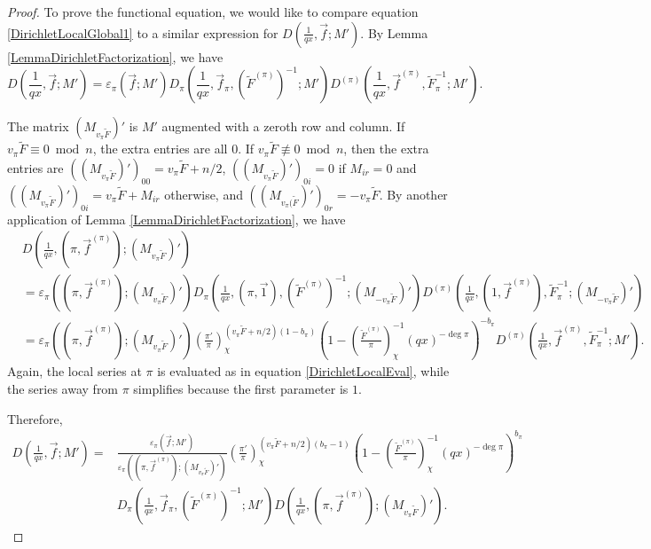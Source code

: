 \documentclass[11pt,letterpaper]{article}
\theoremstyle{definition}
\theoremstyle{remark}
\numberwithin{equation}{section}
\theoremstyle{dotless}
\newcommand{\res}[2]{\left(\frac{#1}{#2}\right)}
\renewcommand{\tilde}{\widetilde}
\begin{document}
\begin{proof}
To prove the functional equation, we would like to compare equation \eqref{DirichletLocalGlobal1} to a similar expression for $D\left(\frac{1}{qx}, \vec{f}; M'\right)$. By Lemma \ref{LemmaDirichletFactorization}, we have  
\begin{equation*}
    D\left(\frac{1}{qx}, \vec{f}; M'\right) = \varepsilon_\pi(\vec{f}; M') D_{\pi}\left(\frac{1}{qx}, \vec{f}_{\pi}, (\tilde{F}^{(\pi)})^{-1}; M'\right) D^{(\pi)}\left(\frac{1}{qx}, \vec{f}^{(\pi)}, \tilde{F}_{\pi}^{-1}; M'\right).
\end{equation*} 

The matrix $(M_{v_\pi \tilde{F}})'$ is $M'$ augmented with a zeroth row and column. If $v_\pi \tilde{F} \equiv 0 \bmod n$, the extra entries are all $0$. If $v_\pi \tilde{F} \not\equiv 0 \bmod n$, then the extra entries are $((M_{v_\pi \tilde{F}})')_{00}=v_\pi \tilde{F} + n/2$, $((M_{v_\pi \tilde{F}})')_{0i}=0$ if $M_{ir}=0$ and $((M_{v_\pi \tilde{F}})')_{0i}=v_\pi \tilde{F}+M_{ir}$ otherwise, and $((M_{v_\pi(\tilde{F}})')_{0r}=-v_\pi \tilde{F}$. By another application of Lemma \ref{LemmaDirichletFactorization}, we have
\begin{equation*}
\begin{split}
    &D\left(\frac{1}{qx}, (\pi, \vec{f}^{(\pi)}); (M_{v_\pi \tilde{F}})'\right) \\
    &= \varepsilon_\pi((\pi, \vec{f}^{(\pi)}); (M_{v_\pi\tilde{F}})') D_{\pi}\left(\frac{1}{qx}, (\pi, \vec{1}), (\tilde{F}^{(\pi)})^{-1}; (M_{-v_\pi \tilde{F}})'\right)
    D^{(\pi)}\left(\frac{1}{qx}, (1,\vec{f}^{(\pi)}), \tilde{F}_{\pi}^{-1}; (M_{-v_\pi \tilde{F}})'\right) \\
    &= \varepsilon_\pi((\pi, \vec{f}^{(\pi)}); (M_{v_\pi\tilde{F}})') \res{\pi'}{\pi}_\chi^{(v_\pi \tilde{F} +n/2)(1-b_\pi)}
    \left(1-\res{\tilde{F}^{(\pi)}}{\pi}_{\chi}^{-1} (qx)^{-\deg \pi}\right)^{-b_{\pi}}D^{(\pi)}\left(\frac{1}{qx}, \vec{f}^{(\pi)}, \tilde{F}_{\pi}^{-1}; M'\right).
\end{split}
\end{equation*}
Again, the local series at $\pi$ is evaluated as in equation \eqref{DirichletLocalEval}, while the series away from $\pi$ simplifies because the first parameter is $1$. 

Therefore, 
\begin{equation} \label{DirichletLocalGlobal2}
    \begin{split}
    D\left(\frac{1}{qx}, \vec{f}; M'\right) = &\frac{\varepsilon_\pi(\vec{f}; M')}{\varepsilon_\pi((\pi, \vec{f}^{(\pi)}); (M_{v_\pi\tilde{F}})')} \res{\pi'}{\pi}_\chi^{(v_\pi \tilde{F} +n/2)(b_\pi-1)} \left(1-\res{\tilde{F}^{(\pi)}}{\pi}_{\chi}^{-1} (qx)^{-\deg \pi}\right)^{b_{\pi}} \\
    & D_{\pi}\left(\frac{1}{qx}, \vec{f}_{\pi}, (\tilde{F}^{(\pi)})^{-1}; M'\right) D\left(\frac{1}{qx}, \left(\pi, \vec{f}^{(\pi)}\right); (M_{v_\pi \tilde{F}})'\right).
    \end{split}
\end{equation}


\end{proof}
\end{document}
